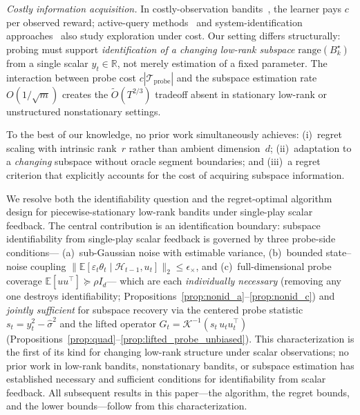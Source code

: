 \documentclass[11pt]{article}
\newcommand{\R}{\mathbb{R}}
\newcommand{\E}{\mathbb{E}}
\newcommand{\cH}{\mathcal{H}}
\newcommand{\cTprobe}{\mathcal{T}_{\mathrm{probe}}}
\newcommand{\range}{\mathrm{range}}
\begin{document}
\emph{Costly information acquisition.}
In costly-observation bandits~\citep{seldin2014paid,tucker2023costly,elumar2025costly},
the learner pays $c$ per observed reward;
active-query methods~\citep{sekhari2023contextual} and system-identification
approaches~\citep{memmel2024asid} also study exploration under cost.
Our setting differs structurally: probing must support \emph{identification of a changing
low-rank subspace} $\range(B_k^\star)$ from a single scalar $y_t\in\R$, not merely
estimation of a fixed parameter.
The interaction between probe cost $c|\cTprobe|$ and the subspace estimation rate
$O(1/\sqrt{m})$ creates the $\widetilde{O}(T^{2/3})$ tradeoff absent in stationary
low-rank or unstructured nonstationary settings.

To the best of our knowledge, no prior work simultaneously achieves:
(i)~regret scaling with intrinsic rank~$r$ rather than ambient dimension~$d$;
(ii)~adaptation to a \emph{changing} subspace without oracle segment boundaries;
and (iii)~a regret criterion that explicitly accounts for the cost of acquiring
subspace information.

We resolve both the identifiability question and the regret-optimal algorithm design
for piecewise-stationary low-rank bandits under single-play scalar feedback.
The central contribution is an identification boundary:
subspace identifiability from single-play scalar feedback is governed
by three probe-side conditions---%
(a)~sub-Gaussian noise with estimable variance,
(b)~bounded state--noise coupling $\|\E[\varepsilon_t\theta_t\mid\cH_{t-1},u_t]\|_2
\le\epsilon_\times$,
and (c)~full-dimensional probe coverage $\E[uu^\top]\succeq\rho I_d$---%
which are each \emph{individually necessary} (removing any one destroys
identifiability; Propositions~\ref{prop:nonid_a}--\ref{prop:nonid_c})
and \emph{jointly sufficient} for subspace recovery via the centered probe statistic
$s_t = y_t^2 - \hat\sigma^2$ and the lifted operator
$G_t = \mathcal{K}^{-1}(s_t\,u_tu_t^\top)$
(Propositions~\ref{prop:quad}--\ref{prop:lifted_probe_unbiased}).
This characterization is the first of its kind for changing low-rank structure
under scalar observations; no prior work in low-rank bandits, nonstationary bandits,
or subspace estimation has established necessary and sufficient conditions
for identifiability from scalar feedback.
All subsequent results in this paper---the algorithm, the regret bounds,
and the lower bounds---follow from this characterization.
\end{document}
